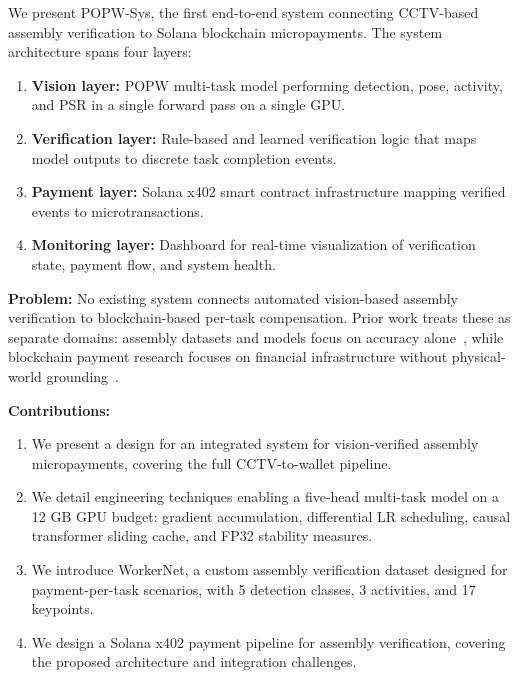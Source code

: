 \documentclass[10pt,twocolumn]{article}
\newcommand{\popw}{POPW}
\newcommand{\popwsys}{POPW-Sys}
\begin{document}
We present \popwsys{}, the first end-to-end system connecting CCTV-based assembly verification to Solana blockchain micropayments. The system architecture spans four layers:

\begin{enumerate}[nosep]
\item \textbf{Vision layer:} \popw{} multi-task model performing detection, pose, activity, and PSR in a single forward pass on a single GPU.
\item \textbf{Verification layer:} Rule-based and learned verification logic that maps model outputs to discrete task completion events.
\item \textbf{Payment layer:} Solana x402 smart contract infrastructure mapping verified events to microtransactions.
\item \textbf{Monitoring layer:} Dashboard for real-time visualization of verification state, payment flow, and system health.
\end{enumerate}

\textbf{Problem:} No existing system connects automated vision-based assembly verification to blockchain-based per-task compensation. Prior work treats these as separate domains: assembly datasets and models focus on accuracy alone~\cite{schoonbeek2024industreal,benshabat2021ikea}, while blockchain payment research focuses on financial infrastructure without physical-world grounding~\cite{solana2024x402}.

\textbf{Contributions:}
\begin{enumerate}
\item We present a design for an integrated system for vision-verified assembly micropayments, covering the full CCTV-to-wallet pipeline.
\item We detail engineering techniques enabling a five-head multi-task model on a 12 GB GPU budget: gradient accumulation, differential LR scheduling, causal transformer sliding cache, and FP32 stability measures.
\item We introduce WorkerNet, a custom assembly verification dataset designed for payment-per-task scenarios, with 5 detection classes, 3 activities, and 17 keypoints.
\item We design a Solana x402 payment pipeline for assembly verification, covering the proposed architecture and integration challenges.
\end{enumerate}

\FloatBarrier

\end{document}
